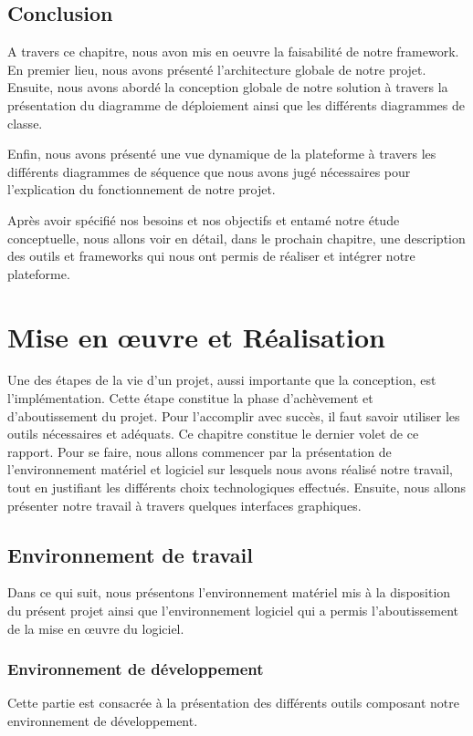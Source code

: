 \documentclass[12pt, ChapStyle1, oneside]{./Styles/Dea_Gsm}
\begin{document}
\section{Conclusion}
A travers ce chapitre, nous avon mis en oeuvre la faisabilité de notre framework. En premier lieu, nous avons présenté l’architecture globale de notre projet. Ensuite, nous avons abordé la conception globale de notre solution à travers la présentation du diagramme de déploiement ainsi que les différents diagrammes de classe.


Enfin, nous avons présenté une vue dynamique de la plateforme à travers les différents diagrammes de séquence que nous avons jugé nécessaires pour l’explication du fonctionnement de notre projet.


Après avoir spécifié nos besoins et nos objectifs et entamé notre étude conceptuelle, nous allons voir en détail, dans le prochain chapitre, une description des outils et frameworks qui nous ont permis de réaliser et intégrer notre plateforme.
\chapter{Mise en œuvre et Réalisation}
\vspace*{3cm}
Une des étapes de la vie d'un projet, aussi importante que la conception, est l'implémentation. Cette étape constitue la phase d'achèvement et d'aboutissement du projet. Pour l'accomplir avec succès, il faut savoir utiliser les outils nécessaires et adéquats. Ce chapitre constitue le dernier volet de ce rapport. Pour se faire, nous allons commencer par la présentation de l'environnement matériel et logiciel sur lesquels nous avons réalisé notre travail, tout en justifiant les différents choix technologiques effectués. Ensuite, nous allons présenter notre travail à travers quelques interfaces graphiques.
\pagebreak
\section{Environnement de travail}
Dans ce qui suit, nous présentons l’environnement matériel mis à la disposition du présent projet ainsi que l’environnement logiciel qui a permis l’aboutissement de la mise en œuvre du logiciel.

\subsection{Environnement de développement}
Cette partie est consacrée à la présentation des différents outils composant notre environnement de développement.
\end{document}
